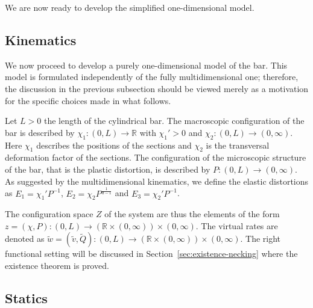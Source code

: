 \documentclass[a4paper,10pt,twoside]{amsbook}
\numberwithin{section}{chapter}
\numberwithin{equation}{chapter}
\theoremstyle{definition}
\begin{document}
We are now ready to develop the simplified one-dimensional model.

\subsection{Kinematics}

We now proceed to develop a purely one-dimensional model of the bar. This model is formulated independently of the fully multidimensional one; therefore, the discussion in the previous subsection should be viewed merely as a motivation for the specific choices made in what follows.

Let $L>0$ the length of the cylindrical bar. The macroscopic configuration of the bar is described by $\chi_1\colon(0,L)\to\mathbb{R}$ with $\chi_1'>0$ and $\chi_2\colon(0,L)\to(0,\infty)$. Here $\chi_1$ describes the positions of the sections and $\chi_2$ is the transversal deformation factor of the sections. The configuration of the microscopic structure of the bar, that is the plastic distortion, is described by $P\colon(0,L)\to(0,\infty)$. As suggested by the multidimensional kinematics, we define the elastic distortions as $E_1=\chi_1'P^{-1}$, $E_2=\chi_2P^{\frac{1}{d-1}}$ and $E_3=\chi_2'P^{-1}$.

The configuration space $Z$ of the system are thus the elements of the form $z=(\chi,P)\colon(0,L)\to(\mathbb{R}\times(0,\infty))\times(0,\infty)$. The virtual rates are denoted as $\tilde w=(\tilde v,\tilde Q)\colon(0,L)\to(\mathbb{R}\times(0,\infty))\times(0,\infty)$. The right functional setting will be discussed in Section~\ref{sec:existence-necking} where the existence theorem is proved.

\subsection{Statics}
\end{document}
